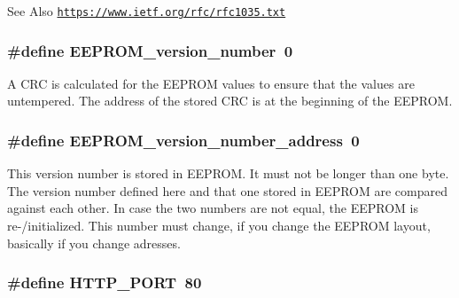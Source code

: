 \begin{DoxySeeAlso}{See Also}
\href{https://www.ietf.org/rfc/rfc1035.txt}{\tt https\-://www.\-ietf.\-org/rfc/rfc1035.\-txt} 
\end{DoxySeeAlso}
\hypertarget{WIFIOnOff_8ino_aa3109b452678c4716d01ff98ce34a2da}{
\subsubsection[{E\-E\-P\-R\-O\-M\-\_\-version\-\_\-number}]{\setlength{\rightskip}{0pt plus 5cm}\#define E\-E\-P\-R\-O\-M\-\_\-version\-\_\-number~0}}\label{WIFIOnOff_8ino_aa3109b452678c4716d01ff98ce34a2da}


A C\-R\-C is calculated for the E\-E\-P\-R\-O\-M values to ensure that the values are untempered. The address of the stored C\-R\-C is at the beginning of the E\-E\-P\-R\-O\-M. 

\hypertarget{WIFIOnOff_8ino_a573ec4699f45eaca686a077e5881d66b}{
\subsubsection[{E\-E\-P\-R\-O\-M\-\_\-version\-\_\-number\-\_\-address}]{\setlength{\rightskip}{0pt plus 5cm}\#define E\-E\-P\-R\-O\-M\-\_\-version\-\_\-number\-\_\-address~0}}\label{WIFIOnOff_8ino_a573ec4699f45eaca686a077e5881d66b}


This version number is stored in E\-E\-P\-R\-O\-M. It must not be longer than one byte. The version number defined here and that one stored in E\-E\-P\-R\-O\-M are compared against each other. In case the two numbers are not equal, the E\-E\-P\-R\-O\-M is re-\//initialized. This number must change, if you change the E\-E\-P\-R\-O\-M layout, basically if you change adresses. 

\hypertarget{WIFIOnOff_8ino_a0906dae4a42c1fef9ec0cd0a5212ed4a}{
\subsubsection[{H\-T\-T\-P\-\_\-\-P\-O\-R\-T}]{\setlength{\rightskip}{0pt plus 5cm}\#define H\-T\-T\-P\-\_\-\-P\-O\-R\-T~80}}\label{WIFIOnOff_8ino_a0906dae4a42c1fef9ec0cd0a5212ed4a}


